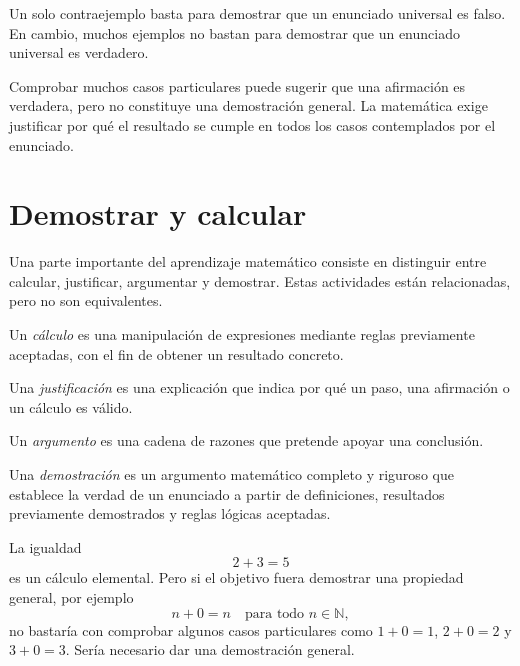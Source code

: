 Un solo contraejemplo basta para demostrar que un enunciado universal es falso. En cambio, muchos ejemplos no bastan para demostrar que un enunciado universal es verdadero.

\begin{advertencia}
Comprobar muchos casos particulares puede sugerir que una afirmación es verdadera, pero no constituye una demostración general. La matemática exige justificar por qué el resultado se cumple en todos los casos contemplados por el enunciado.
\end{advertencia}

\section{Demostrar y calcular}
\label{sec:demostrar-calcular}

Una parte importante del aprendizaje matemático consiste en distinguir entre calcular, justificar, argumentar y demostrar. Estas actividades están relacionadas, pero no son equivalentes.

\begin{definicion}[Cálculo]
Un \emph{cálculo} es una manipulación de expresiones mediante reglas previamente aceptadas, con el fin de obtener un resultado concreto.
\end{definicion}

\begin{definicion}[Justificación]
Una \emph{justificación} es una explicación que indica por qué un paso, una afirmación o un cálculo es válido.
\end{definicion}

\begin{definicion}[Argumento]
Un \emph{argumento} es una cadena de razones que pretende apoyar una conclusión.
\end{definicion}

\begin{definicion}[Demostración]
Una \emph{demostración} es un argumento matemático completo y riguroso que establece la verdad de un enunciado a partir de definiciones, resultados previamente demostrados y reglas lógicas aceptadas.
\end{definicion}

\begin{ejemplo}
La igualdad
\[
  2+3=5
\]
es un cálculo elemental. Pero si el objetivo fuera demostrar una propiedad general, por ejemplo
\[
  n+0=n \quad \text{para todo } n\in\mathbb{N},
\]
no bastaría con comprobar algunos casos particulares como \(1+0=1\), \(2+0=2\) y \(3+0=3\). Sería necesario dar una demostración general.
\end{ejemplo}

